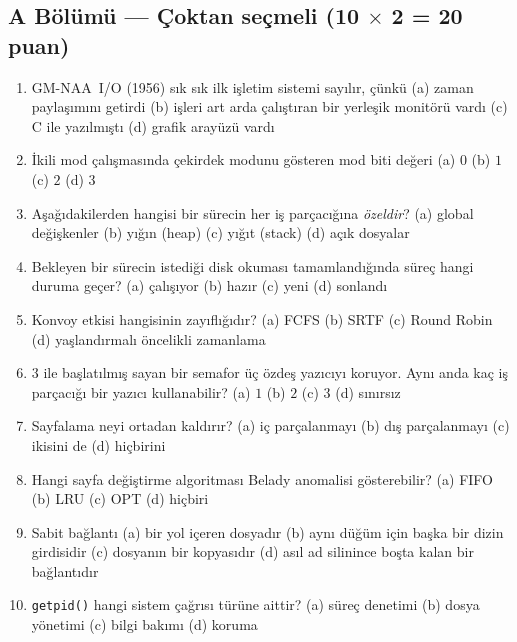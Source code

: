 \documentclass[11pt,a4paper]{article}
\newcommand{\cmd}[1]{\texttt{#1}}
\begin{document}
\subsection*{A Bölümü --- Çoktan seçmeli \hfill (10 $\times$ 2 = 20 puan)}
\begin{enumerate}[leftmargin=2.0em,label=A\arabic*.,itemsep=0.3em]
  \item GM-NAA~I/O (1956) sık sık ilk işletim sistemi sayılır, çünkü \quad (a) zaman paylaşımını getirdi \quad (b) işleri art arda çalıştıran bir yerleşik monitörü vardı \quad (c) C ile yazılmıştı \quad (d) grafik arayüzü vardı
  \item İkili mod çalışmasında çekirdek modunu gösteren mod biti değeri \quad (a) $0$ \quad (b) $1$ \quad (c) $2$ \quad (d) $3$
  \item Aşağıdakilerden hangisi bir sürecin her iş parçacığına \emph{özeldir}? \quad (a) global değişkenler \quad (b) yığın (heap) \quad (c) yığıt (stack) \quad (d) açık dosyalar
  \item Bekleyen bir sürecin istediği disk okuması tamamlandığında süreç hangi duruma geçer? \quad (a) çalışıyor \quad (b) hazır \quad (c) yeni \quad (d) sonlandı
  \item Konvoy etkisi hangisinin zayıflığıdır? \quad (a) FCFS \quad (b) SRTF \quad (c) Round Robin \quad (d) yaşlandırmalı öncelikli zamanlama
  \item $3$ ile başlatılmış sayan bir semafor üç özdeş yazıcıyı koruyor. Aynı anda kaç iş parçacığı bir yazıcı kullanabilir? \quad (a) $1$ \quad (b) $2$ \quad (c) $3$ \quad (d) sınırsız
  \item Sayfalama neyi ortadan kaldırır? \quad (a) iç parçalanmayı \quad (b) dış parçalanmayı \quad (c) ikisini de \quad (d) hiçbirini
  \item Hangi sayfa değiştirme algoritması Belady anomalisi gösterebilir? \quad (a) FIFO \quad (b) LRU \quad (c) OPT \quad (d) hiçbiri
  \item Sabit bağlantı \quad (a) bir yol içeren dosyadır \quad (b) aynı düğüm için başka bir dizin girdisidir \quad (c) dosyanın bir kopyasıdır \quad (d) asıl ad silinince boşta kalan bir bağlantıdır
  \item \cmd{getpid()} hangi sistem çağrısı türüne aittir? \quad (a) süreç denetimi \quad (b) dosya yönetimi \quad (c) bilgi bakımı \quad (d) koruma
\end{enumerate}
\end{document}
